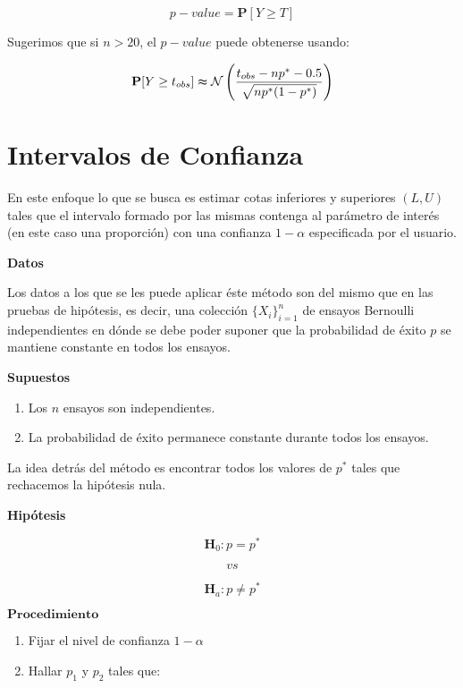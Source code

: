 \documentclass[
  a4paper,
  oneside,
  openany]{book}
\begin{document}
\[p-value= \mathbf{P}[Y \geq T]\]

Sugerimos que si \(n > 20\), el \(p-value\) puede obtenerse usando:

\[\mathbf{P}[Y\geq t_{obs}] \thickapprox \mathcal{N} \left(\frac{t_{obs}-np^*-0.5}{\sqrt{np^*(1-p^*)}}\right)\]

\hypertarget{intervalos-de-confianza}{%
\section{Intervalos de Confianza}\label{intervalos-de-confianza}}

En este enfoque lo que se busca es estimar cotas inferiores y superiores \((L,U)\) tales que el intervalo formado por las mismas contenga al parámetro de interés (en este caso una proporción) con una confianza \(1-\alpha\) especificada por el usuario.

\textbf{Datos}

Los datos a los que se les puede aplicar éste método son del mismo que en las pruebas de hipótesis, es decir, una colección \(\{X_{i}\}_{i=1}^n\) de ensayos Bernoulli independientes en dónde se debe poder suponer que la probabilidad de éxito \(p\) se mantiene constante en todos los ensayos.

\textbf{Supuestos}

\begin{enumerate}
\def\labelenumi{\arabic{enumi})}
\item
  Los \(n\) ensayos son independientes.
\item
  La probabilidad de éxito permanece constante durante todos los ensayos.
\end{enumerate}

La idea detrás del método es encontrar todos los valores de \(p^*\) tales que rechacemos la hipótesis nula.

\textbf{Hipótesis}

\[\textbf{H}_{0}: p = p^*\]

\[vs\]

\[\textbf{H}_{a}: p \neq p^*\]

\(\mathbf{Procedimiento}\)

\begin{enumerate}
\def\labelenumi{\arabic{enumi})}
\item
  Fijar el nivel de confianza \(1-\alpha\)
\item
  Hallar \(p_{1}\) y \(p_{2}\) tales que:
\end{enumerate}
\end{document}
